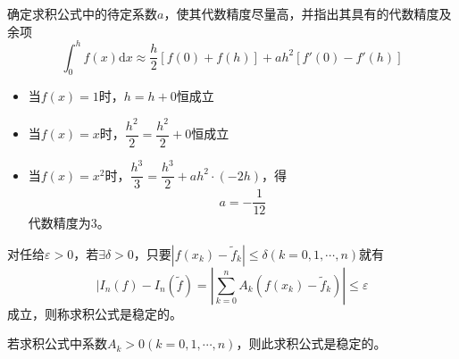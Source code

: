 \begin{example}
    确定求积公式中的待定系数$a$，使其代数精度尽量高，并指出其具有的代数精度及余项
    \[
        \int_{0}^{h}f(x)\mathrm{d}x\approx \dfrac{h}{2}\left[ f(0)+f(h) \right]+ah^2\left[ f'(0)-f'(h) \right]
    \]
    \begin{solution}
        \begin{itemize}
            \item 当$f(x) = 1$时，$h = h+0$恒成立
            \item 当$f(x) = x$时，$\dfrac{h^2}{2} = \dfrac{h^2}{2}+0$恒成立
            \item 当$f(x) = x^2$时，$\dfrac{h^3}{3} = \dfrac{h^3}{2} + ah^2\cdot (-2h)$，得
            \[
                a = -\dfrac{1}{12}
            \]
            代数精度为$3$。
        \end{itemize}
    \end{solution}
\end{example}
\begin{definition}
    对任给$\varepsilon>0$，若$\exists \delta>0$，只要$|f(x_k)-\tilde{f}_{k}|\leqslant \delta(k = 0,1,\cdots,n)$就有
    \[
        |I_{n}(f)-I_{n}(\tilde{f}) = \left|\sum_{k=0}^{n}A_{k}(f(x_{k})-\widetilde{f}_{k})\right|\leqslant \varepsilon
    \]
    成立，则称求积公式是稳定的。
\end{definition}
\begin{theorem}
    若求积公式中系数$A_k>0(k = 0,1,\cdots, n)$，则此求积公式是稳定的。
\end{theorem}
